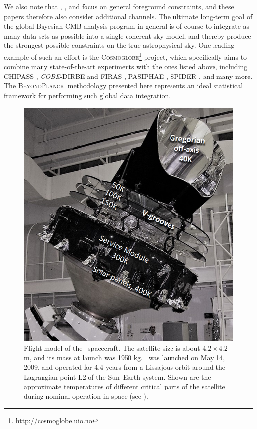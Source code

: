 \documentclass[twocolumn]{aa}
\newcommand{\BP}{\textsc{BeyondPlanck}}
\begin{document}
We also note that \citet{bp13}, \citet{bp14}, and \citet{bp15} focus
on general foreground constraints, and these papers therefore also
consider additional channels. The ultimate long-term goal of the
global Bayesian CMB analysis program in general is of course to
integrate as many data sets as possible into a single coherent sky
model, and thereby produce the strongest possible constraints on the
true astrophysical sky. One leading example of such an effort is the
\textsc{Cosmoglobe}\footnote{\href{url}{http://cosmoglobe.uio.no}}
project, which specifically aims to combine many state-of-the-art
experiments with the ones listed above, including CHIPASS
\citep{calabretta:2014}, \emph{COBE}-DIRBE \citep{hauser:1998} and
FIRAS \citep{mather:1994}, PASIPHAE \citep{tassis:2018}, SPIDER
\citep{gualtieri:2018}, and many more. The \BP\ methodology presented
here represents an ideal statistical framework for performing such
global data integration.

\begin{figure}[t]
	\center
	\includegraphics[width=\linewidth]{figs/PLANCK-PICTURE.png}
	\caption{Flight model of the \Planck\ spacecraft. The satellite size is about $4.2 \times 4.2$\,m, and its mass at launch was 1950 kg. \Planck\ was launched on May 14, 2009, and operated for 4.4 years from a Lissajous orbit around the Lagrangian point L2 of the Sun--Earth system. Shown are the approximate temperatures of different critical parts of the satellite during nominal operation in space (see \citealp{planck2011-1.3}).}
	\label{fig:PLANCK-PICTURE}
\end{figure}
\end{document}
